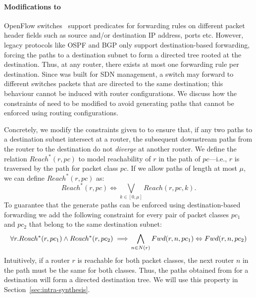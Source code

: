 \paragraph{Modifications to \genesis}
OpenFlow switches~\cite{openflow} support predicates for
forwarding rules on different packet header fields such as source
and/or destination IP address, ports etc. However, legacy protocols
like OSPF and BGP only support destination-based forwarding, 
forcing the paths to a destination subnet to 
form a directed tree rooted at the destination. 
Thus,
at any router, there exists at most one forwarding rule per destination. 
Since \genesis was built for
SDN management,  a switch may forward to different switches
packets that are directed to the same destination;
this behaviour cannot be induced with router
configurations. We  discuss how the
constraints of \genesis
need to be modified to avoid generating paths that 
cannot be enforced using routing configurations.

Concretely, we modify the constraints given to \genesis to ensure that,
if any two paths to a destination subnet intersect at a router,
the subsequent downstream paths from the router to the destination 
 do not \emph{diverge} at another router.  
We define the relation $Reach^*(r,pc)$ to model reachability 
of $r$ in the path of $pc$---i.e., $r$ is traversed by the path for packet class $pc$. 
If we allow paths of length at most $\mu$, we can define $Reach^*(r,pc)$ as:
\begin{equation}
	Reach^*(r,pc) \Leftrightarrow \bigvee_{k \in [0, \mu]} Reach(r, pc, k).
\end{equation}
To guarantee that the generate paths can be enforced using destination-based
forwarding we add
the following constraint for every pair of packet classes $pc_1$ and $pc_2$ that belong to the same 
 destination subnet:
 \begin{equation}
 \forall r. Reach^*(r, pc_1) \wedge Reach^*(r, pc_2) 
 \implies \\ \bigwedge_{n \in N(r)} Fwd(r, n, pc_1) \Leftrightarrow Fwd(r, n, pc_2)
 \end{equation}
Intuitively, 
 if a router $r$ is reachable for both packet classes, 
the next router $n$ in the path must be the same for both classes. Thus, the paths obtained
 from \genesis for a destination will form a 
 directed destination tree.
 We will use this property in Section~\ref{sec:intra-synthesis}. 

